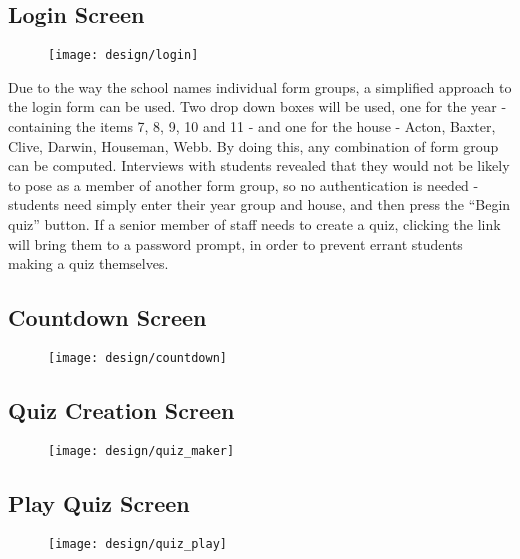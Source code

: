 \subsection{Login Screen}
\begin{figure}[h!]
  \texttt{[image: design/login]}
\end{figure}

Due to the way the school names individual form groups, a simplified approach to the login form can be used. Two drop down boxes will be used, one for the year - containing the items 7, 8, 9, 10 and 11 - and one for the house - Acton, Baxter, Clive, Darwin, Houseman, Webb. By doing this, any combination of form group can be computed. Interviews with students revealed that they would not be likely to pose as a member of another form group, so no authentication is needed - students need simply enter their year group and house, and then press the ``Begin quiz'' button. If a senior member of staff needs to create a quiz, clicking the link will bring them to a password prompt, in order to prevent errant students making a quiz themselves.

\clearpage

\subsection{Countdown Screen}
\begin{figure}[h!]
  \texttt{[image: design/countdown]}
\end{figure}

\clearpage

\subsection{Quiz Creation Screen}
\begin{figure}[h!]
  \texttt{[image: design/quiz\_maker]}
\end{figure}

\clearpage

\subsection{Play Quiz Screen}
\begin{figure}[h!]
  \texttt{[image: design/quiz\_play]}
\end{figure}
